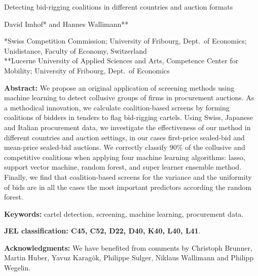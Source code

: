 \documentclass[a4paper,11pt]{article}
\begin{document}
 \doublespacing \pagestyle{plain}
	
	\def\ci{\perp\!\!\!\perp}
	\begin{center}
		
		{\LARGE Detecting bid-rigging coalitions in different countries and auction formats}
		
		{\large \vspace{0.8cm}}
		
		{\large David Imhof* and Hannes Wallimann** }\medskip
		
		{\small {*Swiss Competition Commission; University of Fribourg, Dept.\ of Economics; Unidistance, Faculty of Economy, Switzerland \\ **Lucerne University of Applied Sciences and Arts, Competence Center for Mobility; University of Fribourg, Dept.\ of Economics} \bigskip }
	\end{center}
	
	\smallskip
	
	
	\noindent \textbf{Abstract:} {\small We propose an original application of screening methods using machine learning to detect collusive groups of firms in procurement auctions. As a methodical innovation, we calculate coalition-based screens by forming coalitions of bidders in tenders to flag bid-rigging cartels. Using Swiss, Japanese and Italian procurement data, we investigate the effectiveness of our method in different countries and auction settings, in our cases first-price sealed-bid and mean-price sealed-bid auctions. We correctly classify 90\% of the collusive and competitive coalitions when applying four machine learning algorithms: lasso, support vector machine, random forest, and super learner ensemble method. Finally, we find that coalition-based screens for the variance and the uniformity of bids are in all the cases the most important predictors according the random forest.
	}
	
	{\small \smallskip }
	{\small \smallskip }
	{\small \smallskip }
	
	{\small \noindent \textbf{Keywords:} cartel detection, screening, machine learning, procurement data.}
	
	
	{\small \smallskip }
	{\small \smallskip }
	{\small \smallskip }
	
	{\small \noindent \textbf{JEL classification: C45, C52, D22, D40, K40, L40, L41}.  \quad }
	
	
	{\small \smallskip }
	{\small \smallskip }
	{\small \smallskip }
	
	{\small \noindent \textbf{Acknowledgments:}  We have benefited from comments by Christoph Brunner, Martin Huber, Yavuz Karagök, Philippe Sulger, Niklaus Wallimann and Philipp Wegelin.}
	
\end{document}
